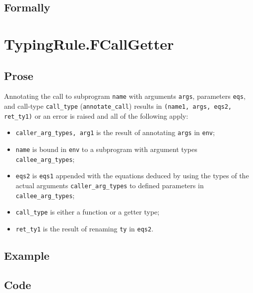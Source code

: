 \documentclass{book}
\begin{document}
\begin{emptyformal}
    \subsection{Formally}
\end{emptyformal}


\section{TypingRule.FCallGetter \label{sec:TypingRule.FCallGetter}}

  \subsection{Prose}
  Annotating the call to subprogram \texttt{name} with arguments \texttt{args},
  parameters \texttt{eqs}, and call-type \texttt{call\_type}
  (\texttt{annotate\_call}) results in \texttt{(name1, args, eqs2, ret\_ty1)}
  or an error is raised and all of the following apply:
   \begin{itemize}
   \item \texttt{caller\_arg\_types, arg1} is the result of annotating \texttt{args} in \texttt{env};
   \item \texttt{name} is bound in \texttt{env} to a subprogram with argument types
      \texttt{callee\_arg\_types};
   \item \texttt{eqs2} is \texttt{eqs1} appended with the equations deduced by
     using the types of the actual arguments \texttt{caller\_arg\_types} to
     defined parameters in \texttt{callee\_arg\_types};
   \item \texttt{call\_type} is either a function or a getter type;
   \item \texttt{ret\_ty1} is the result of renaming \texttt{ty} in \texttt{eqs2}.
   \end{itemize}

  \subsection{Example}

  \subsection{Code}
\end{document}
